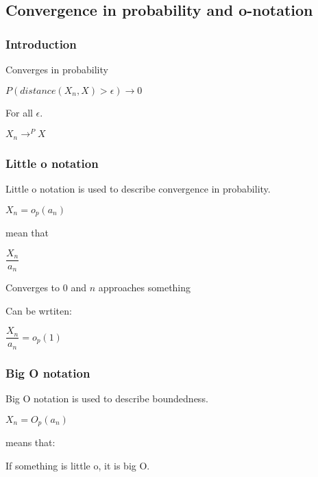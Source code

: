 
\subsection{Convergence in probability and o-notation}

\subsubsection{Introduction}

Converges in probability

\(P(distance(X_n, X)>\epsilon )\rightarrow 0\)

For all \(\epsilon \).

\(X_n \rightarrow^P X\)

\subsubsection{Little o notation}

Little o notation is used to describe convergence in probability.

\(X_n=o_p(a_n)\)

mean that

\(\dfrac{X_n}{a_n}\)

Converges to \(0\) and \(n\) approaches something

Can be wrtiten:

\(\dfrac{X_n}{a_n}=o_p(1)\)

\subsubsection{Big O notation}

Big O notation is used to describe boundedness.

\(X_n=O_p(a_n)\)

means that:

If something is little o, it is big O.

